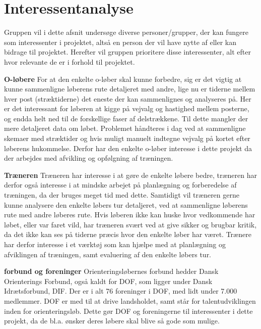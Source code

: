 \section{Interessentanalyse}
Gruppen vil i dette afsnit undersøge diverse personer/grupper, der kan fungere som interessenter i projektet, altså en person der vil have nytte af eller kan bidrage til projektet. Herefter vil gruppen prioritere disse interessenter, alt efter hvor relevante de er i forhold til projektet.  

\textbf{O-løbere} \newline
For at den enkelte o-løber skal kunne forbedre, sig er det vigtig at kunne sammenligne løberens rute detaljeret med andre, lige nu er tiderne mellem hver post (stræktiderne) det eneste der kan sammenlignes og analyseres på. Her er det interessant for løberen at kigge på vejvalg og hastighed mellem posterne, og endda helt ned til de forskellige faser af delstrækkene. Til dette mangler der mere detaljeret data om løbet. Problemet håndteres i dag ved at sammenligne skemaer med stræktider og hvis muligt manuelt indtegne vejvalg på kortet efter løberens hukommelse. Derfor har den enkelte o-løber interesse i dette projekt da der arbejdes med afvikling og opfølgning af træningen. 

\textbf{Træneren}\newline
Træneren har interesse i at gøre de enkelte løbere bedre, træneren har derfor også interesse i at mindske arbejet på planlægning og forberedelse af træningen, da der bruges meget tid med dette. Samtidigt vil træneren gerne kunne analysere den enkelte løbers tur detaljeret, ved at sammenligne løberens rute med andre løberes rute. Hvis løberen ikke kan huske hvor vedkommende har løbet, eller var faret vild, har træneren svært ved at give sikker og brugbar kritik, da det ikke kan ses på tiderne præcis hvor den enkelte løber har været. Trænere har derfor interesse i et værktøj som kan hjælpe med at planlægning og afviklingen af træningen, samt evaluering af den enkelte løbers tur.

\textbf{forbund og foreninger} \newline
Orienteringsløbernes forbund hedder Dansk Orienterings Forbund, også kaldt for DOF, som ligger under Dansk Idrætsforbund, DIF. Der er i alt 76 foreninger i DOF, med lidt under 7.000 medlemmer\citep{DIF}. DOF er med til at drive landsholdet, samt står for talentudviklingen inden for orienteringsløb. Dette gør DOF og foreningerne til interessenter i dette projekt, da de bl.a. ønsker deres løbere skal blive så gode som mulige.\citep{DIF}



